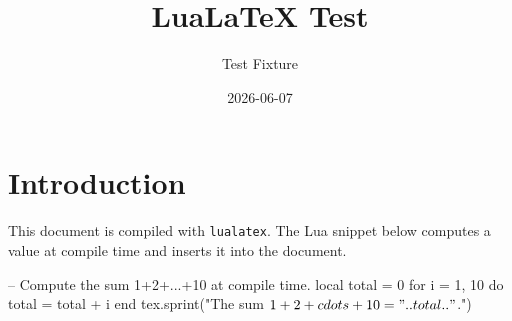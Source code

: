 \documentclass{article}
\title{LuaLaTeX Test}
\author{Test Fixture}
\date{2026-06-07}
\begin{document}
\maketitle

\section{Introduction}
This document is compiled with \texttt{lualatex}.  The Lua snippet below
computes a value at compile time and inserts it into the document.

\begin{luacode}
-- Compute the sum 1+2+...+10 at compile time.
local total = 0
for i = 1, 10 do total = total + i end
tex.sprint("The sum $1 + 2 + \\cdots + 10 = " .. total .. "$.")
\end{luacode}
\end{document}
